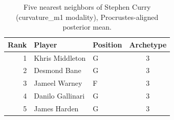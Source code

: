 \begin{table}[htbp]
  \centering\small
  \begin{tabular}{rllc}
    \toprule
    Rank & Player & Position & Archetype \\
    \midrule
    1 & Khris Middleton & G & 3 \\
    2 & Desmond Bane & G & 3 \\
    3 & Jameel Warney & F & 3 \\
    4 & Danilo Gallinari & G & 3 \\
    5 & James Harden & G & 3 \\
    \bottomrule
  \end{tabular}
  \caption{Five nearest neighbors of Stephen Curry (curvature_m1 modality), Procrustes-aligned posterior mean.}
  \label{tab:Stephen_Curry_neighbors_curvature_m1}
\end{table}

